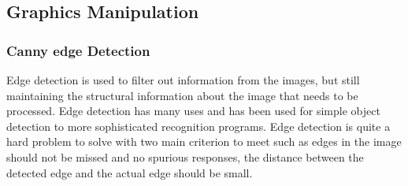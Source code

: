 \subsection{Graphics Manipulation}
\subsubsection{Canny edge Detection}
Edge detection is used to filter out information from the images, but still maintaining the structural information about the image that needs to be processed. Edge detection has many uses and has been used for simple object detection to more sophisticated recognition programs\cite{acronym}. Edge detection is quite a hard problem to solve with two main criterion to meet such as edges in the image should not be missed and no spurious responses, the distance between the detected edge and the actual edge should be small\cite{canny-paper}.

